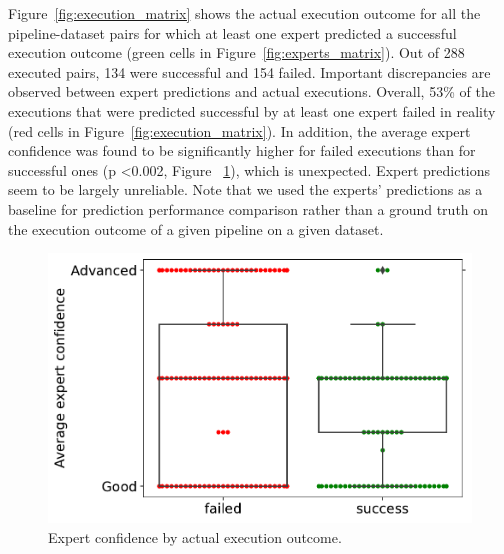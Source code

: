 \documentclass[conference]{IEEEtran}
\begin{document}
Figure~\ref{fig:execution_matrix} shows the actual execution outcome for
all the pipeline-dataset pairs for which at least one expert predicted a
successful execution outcome (green cells in
Figure~\ref{fig:experts_matrix}). Out of 288 executed pairs, 134   were
successful and 154 failed. 
Important discrepancies are observed between expert predictions and actual
executions. Overall, 53\% of the executions that were predicted successful by
at least one expert failed in reality (red cells in
Figure~\ref{fig:execution_matrix}). In addition, the average expert
confidence was found to be significantly higher for failed executions than
for successful ones (p \textless 0.002, Figure
~\ref{fig:confidence_swarm}), which is unexpected. Expert predictions
seem to be largely unreliable. Note that we used the experts' predictions as a baseline for prediction performance comparison rather than a ground truth on the execution outcome of a given pipeline on a given dataset. 

\begin{figure}
  \includegraphics[width=\columnwidth]{figures/Confidence Swarm Experts.pdf}
  \caption{Expert confidence by actual execution outcome.}
  \label{fig:confidence_swarm}
\end{figure}



\end{document}
